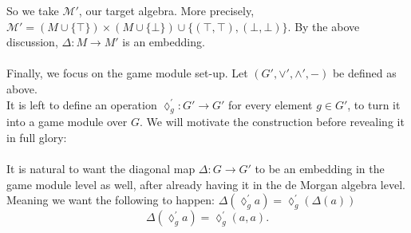 \documentclass[12pt]{article}
\begin{document}
So we take $\mathcal{M}'$, our target algebra. More precisely, 
$\mathcal{M}' = (M \cup \{\top\}) \times (M \cup \{\bot\}) \cup \{(\top, \top), (\bot, \bot)\}.$
By the above discussion, $\Delta : M \longrightarrow M'$ is an embedding. \\ \\
Finally, we focus on the game module set-up. Let $(G',\vee', \wedge', -)$ be defined as above. \\ 
It is left to define an operation $\lozenge_{g}^{'} : G' \longrightarrow G'$ for every element $g \in G'$, to turn it into a game module over $G$. We will motivate the construction before revealing it in full glory: \\ \\
It is natural to want the diagonal map $\Delta : G \to G'$ to be an embedding in the game module level as well, after already having it in the de Morgan algebra level. \\
Meaning we want the following to happen: $\Delta(\lozenge^{'}_g a) = \lozenge^{'}_g (\Delta(a))$
\[
\Delta(\lozenge^{'}_g a) = \lozenge^{'}_g(a,a).
\]
\end{document}
